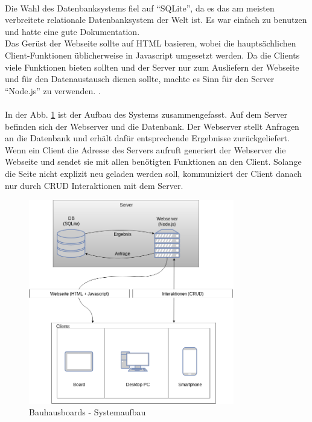 \\
Die Wahl des Datenbanksystems fiel auf ``SQLite''\cite{sqlite:website}, da es das am meisten verbreitete relationale Datenbanksystem der Welt ist. Es war einfach zu benutzen und hatte eine gute Dokumentation.
\\
Das Gerüst der Webseite sollte auf HTML basieren, wobei die hauptsächlichen Client-Funktionen üblicherweise in Javascript umgesetzt werden. Da die Clients viele Funktionen bieten sollten und der Server nur zum Ausliefern der Webseite und für den Datenaustausch dienen sollte, machte es Sinn für den Server ``Node.js'' zu verwenden. .
\\
\\
In der Abb. \ref{img:Systemaufbau} ist der Aufbau des Systems zusammengefasst. Auf dem Server befinden sich der Webserver und die Datenbank. Der Webserver stellt Anfragen an die Datenbank und erhält dafür entsprechende Ergebnisse zurückgeliefert.
\\
Wenn ein Client die Adresse des Servers aufruft generiert der Webserver die Webseite und sendet sie mit allen benötigten Funktionen an den Client. Solange die Seite nicht explizit neu geladen werden soll, kommuniziert der Client danach nur durch CRUD Interaktionen mit dem Server.
\\
\begin{figure}[h!]
  \centering
    \includegraphics[width=0.8\textwidth]{./img/Systemaufbau.png}
  \caption{Bauhausboards - Systemaufbau}
  \label{img:Systemaufbau}
\end{figure}
